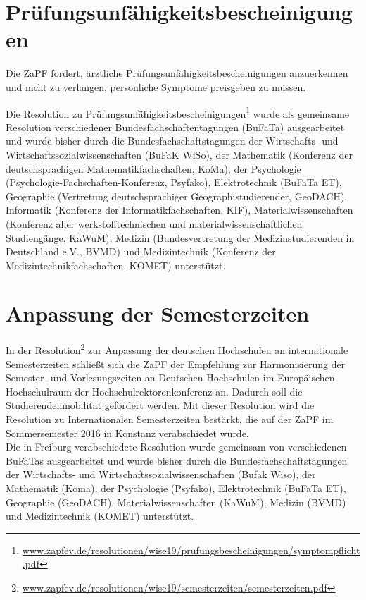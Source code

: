 \section*{Prüfungsunfähigkeitsbescheinigungen} 
Die ZaPF fordert, ärztliche Prüfungsunfähigkeitsbescheinigungen anzuerkennen und nicht zu verlangen, persönliche Symptome preisgeben zu  müssen.

Die Resolution zu Prüfungsunfähigkeitsbescheinigungen\footnote{\href{https://zapfev.de/resolutionen/wise19/prufungsbescheinigungen/symptompflicht.pdf}{www.zapfev.de/resolutionen/wise19/prufungsbescheinigungen/symptompflicht.pdf}} wurde als gemeinsame Resolution verschiedener Bundesfachschaftentagungen (BuFaTa) ausgearbeitet und wurde bisher durch die  Bundesfachschaftstagungen der Wirtschafts- und   Wirtschaftssozialwissenschaften  (BuFaK WiSo), der Mathematik (Konferenz der deutschsprachigen Mathematikfachschaften, KoMa),  der Psychologie  (Psychologie-Fachschaften-Konferenz, Psyfako), Elektrotechnik (BuFaTa ET), Geographie (Vertretung deutschsprachiger Geographistudierender, GeoDACH), Informatik (Konferenz der Informatikfachschaften, KIF), Materialwissenschaften (Konferenz aller werkstofftechnischen und materialwissenschaftlichen Studiengänge, KaWuM), Medizin (Bundesvertretung der Medizinstudierenden in Deutschland e.V., BVMD) und Medizintechnik (Konferenz der Medizintechnikfachschaften, KOMET) unterstützt.

\section*{Anpassung der Semesterzeiten}
In der Resolution\footnote{\href{https://zapfev.de/resolutionen/wise19/semesterzeiten/semesterzeiten.pdf}{www.zapfev.de/resolutionen/wise19/semesterzeiten/semesterzeiten.pdf}} zur Anpassung der deutschen Hochschulen an internationale Semesterzeiten schließt sich die ZaPF der \glqq Empfehlung zur Harmonisierung der Semester- und Vorlesungszeiten an Deutschen Hochschulen im Europäischen Hochschulraum\grqq{} der Hochschulrektorenkonferenz an. Dadurch soll die Studierendenmobilität gefördert werden.
Mit dieser Resolution wird die Resolution zu Internationalen Semesterzeiten bestärkt, die auf der ZaPF im Sommersemester 2016 in Konstanz verabschiedet wurde.\\
Die in Freiburg verabschiedete Resolution wurde gemeinsam von verschiedenen BuFaTas ausgearbeitet und wurde bisher durch die  Bundesfachschaftstagungen der Wirtschafts- und  Wirtschaftssozialwissenschaften  (Bufak Wiso), der Mathematik (Koma), der Psychologie  (Psyfako), Elektrotechnik (BuFaTa ET), Geographie (GeoDACH), Materialwissenschaften (KaWuM), Medizin (BVMD) und Medizintechnik (KOMET) unterstützt.

